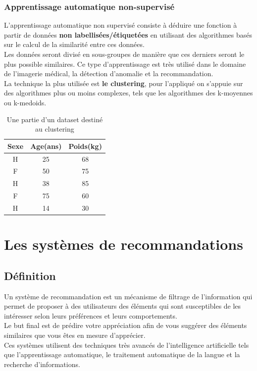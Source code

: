 \subsubsection{Apprentissage automatique non-supervisé}
L'apprentissage automatique non supervisé consiste à déduire une fonction à partir de données \textbf{non labellisées/étiquetées} en utilisant des algorithmes basés sur le calcul de la similarité entre ces données.\\
Les données seront divisé en sous-groupes de manière que ces derniers seront le plus possible similaires.
Ce type d'apprentissage est très utilisé dans le domaine de l'imagerie médical, la détection d'anomalie et la recommandation.\\
La technique la plus utilisée est \textbf{le clustering}, pour l'appliqué on s'appuie sur des algorithmes plus ou moins complexes, tels que les algorithmes des k-moyennes ou k-medoids.
\begin{table}[H]
    \begin{center}
        \begin{tabular}{|c|c|c|}
            \hline
            \textbf{Sexe} & \textbf{Age}(ans) & \textbf{Poids}(kg) \\
            \hline
            H  &  25 & 68 \\
            \hline
            F  &  50 & 75 \\
            \hline
            H  &  38 & 85 \\
            \hline
            F  &  75 & 60 \\
            \hline
            H  &  14 & 30 \\
            \hline
        \end{tabular}
    \end{center}
\caption{Une partie d'un dataset destiné au clustering}
\end{table}

\section{Les systèmes de recommandations}
\subsection{Définition}
Un système de recommandation est un mécanisme de filtrage de l'information qui permet de proposer à des utilisateurs des éléments qui sont susceptibles de les intéresser selon leurs préférences et leurs comportements.\\
Le but final est de prédire votre appréciation afin de vous suggérer des éléments similaires que vous êtes en mesure d'apprécier.\\
Ces systèmes utilisent des techniques très avancés de l'intelligence artificielle tels que l'apprentissage automatique, le traitement automatique de la langue et la recherche d'informations. 

